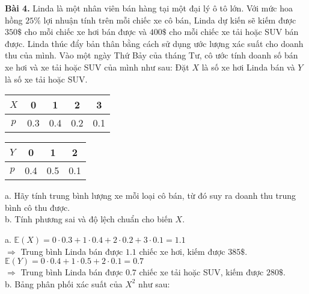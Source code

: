 \documentclass[12pt,a4paper]{article}
\begin{document}
\begin{mybox}
    \textbf{Bài 4.} Linda là một nhân viên bán hàng tại một đại lý ô tô lớn. Với mức hoa hồng $25\%$ lợi nhuận tính trên 
    mỗi chiếc xe cô bán, Linda dự kiến sẽ kiếm được $350\$ $ cho mỗi chiếc xe hơi bán được và $400\$ $ cho mỗi 
    chiếc xe tải hoặc SUV bán được. Linda thúc đẩy bản thân bằng cách sử dụng ước lượng xác suất cho 
    doanh thu của mình. Vào một ngày Thứ Bảy của tháng Tư, cô ước tính doanh số bán xe hơi và xe tải hoặc SUV của mình như sau:
    Đặt $X$ là số xe hơi Linda bán và $Y$ là số xe tải hoặc SUV.
    \begin{table}[H]
        \begin{center}
            \begin{tabular}{|c|c|c|c|c|}
                \hline 
                $X$ & 0 & 1 & 2 & 3 \\ 
                \hline 
                $p$ & 0.3 & 0.4 & 0.2 & 0.1 \\ 
                \hline 
                \end{tabular} 
        \end{center}
    \end{table}
    \begin{table}[H]
        \begin{center}
            \begin{tabular}{|c|c|c|c|}
                \hline 
                $Y$ & 0 & 1 & 2 \\ 
                \hline 
                $p$ & 0.4 & 0.5 & 0.1 \\ 
                \hline 
                \end{tabular} 
        \end{center}
    \end{table}
    a. Hãy tính trung bình lượng xe mỗi loại cô bán, từ đó suy ra doanh thu trung bình cô thu được.\\
    b. Tính phương sai và độ lệch chuẩn cho biến $X.$
\end{mybox}
a. $\mathbb{E} \left( X \right) = 0 \cdot 0.3 + 1 \cdot 0.4 + 2 \cdot 0.2 + 3 \cdot 0.1 = 1.1$\\
$\Rightarrow$ Trung bình Linda bán được $1.1$ chiếc xe hơi, kiếm được $385 \$.$\\
$\mathbb{E} \left( Y \right) = 0 \cdot 0.4 + 1 \cdot 0.5 + 2 \cdot 0.1 = 0.7$\\
$\Rightarrow$ Trung bình Linda bán được $0.7$ chiếc xe tải hoặc SUV, kiếm được $280 \$.$\\
b. Bảng phân phối xác suất của $X^2$ như sau:
\end{document}
